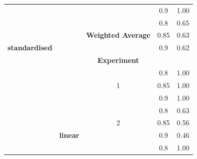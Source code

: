 \documentclass{mpaper}
\begin{document}
\begin{table}[]
\begin{tabular}{|l|c|ccc|}
                                            &                 & \multicolumn{1}{c|}{}                          & \multicolumn{1}{c|}{0.9}                & 1.00               \\ \cline{3-5} 
                                            &                 & \multicolumn{1}{l|}{}                          & \multicolumn{1}{c|}{0.8}                & 0.65               \\
                                            &                 & \multicolumn{1}{c|}{\textbf{Weighted Average}} & \multicolumn{1}{c|}{0.85}               & 0.63               \\
\multicolumn{1}{|c|}{\textbf{standardised}} &                 & \multicolumn{1}{l|}{}                          & \multicolumn{1}{c|}{0.9}                & 0.62               \\ \hline
                                            &                 & \multicolumn{1}{c|}{\textbf{Experiment}}       & \multicolumn{1}{c|}{}                   & \textbf{}          \\ \cline{3-5} 
                                            &                 & \multicolumn{1}{c|}{}                          & \multicolumn{1}{c|}{0.8}                & 1.00               \\
                                            &                 & \multicolumn{1}{c|}{1}                         & \multicolumn{1}{c|}{0.85}               & 1.00               \\
                                            &                 & \multicolumn{1}{c|}{}                          & \multicolumn{1}{c|}{0.9}                & 1.00               \\ \cline{3-5} 
                                            &                 & \multicolumn{1}{c|}{}                          & \multicolumn{1}{c|}{0.8}                & 0.63               \\
                                            &                 & \multicolumn{1}{c|}{2}                         & \multicolumn{1}{c|}{0.85}               & 0.56               \\
                                            & \textbf{linear} & \multicolumn{1}{c|}{}                          & \multicolumn{1}{c|}{0.9}                & 0.46               \\ \cline{3-5} 
                                            &                 & \multicolumn{1}{c|}{}                          & \multicolumn{1}{c|}{0.8}                & 1.00               \\

\end{tabular}
\end{table}
\end{document}
